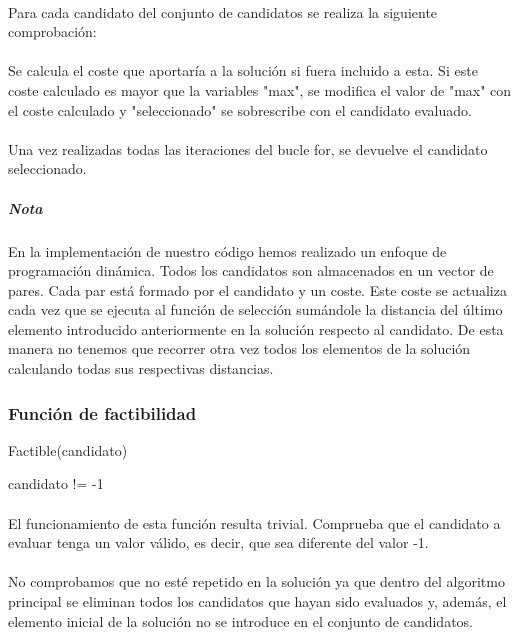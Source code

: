 \documentclass{article}
\begin{document}
	\paragraph{}Para cada candidato del conjunto de candidatos se realiza la siguiente comprobación:
	
	\paragraph{}Se calcula el coste que aportaría a la solución si fuera incluido a esta. Si este coste calculado es mayor que la variables "max", se modifica el valor de "max" con el coste calculado y "seleccionado" se sobrescribe con el candidato evaluado.
	
	\paragraph{}Una vez realizadas todas las iteraciones del bucle for, se devuelve el candidato seleccionado.
	
	\subparagraph{Nota}En la implementación de nuestro código hemos realizado un enfoque de programación dinámica. Todos los candidatos son almacenados en un vector de pares. Cada par está formado por el candidato y un coste. Este coste se actualiza cada vez que se ejecuta al función de selección sumándole la distancia del último elemento introducido anteriormente en la solución respecto al candidato. De esta manera no tenemos que recorrer otra vez todos los elementos de la solución calculando todas sus respectivas distancias.

	\subsubsection{Función de factibilidad}
	\begin{algorithm}[H]
		\caption{Factible(candidato)}
		\begin{algorithmic}
			\RETURN candidato != -1
		\end{algorithmic}
	\end{algorithm}

	\paragraph{}El funcionamiento de esta función resulta trivial. Comprueba que el candidato a evaluar tenga un valor válido, es decir, que sea diferente del valor -1. 
	
	\paragraph{}No comprobamos que no esté repetido en la solución ya que dentro del algoritmo principal se eliminan todos los candidatos que hayan sido evaluados y, además, el elemento inicial de la solución no se introduce en el conjunto de candidatos. 
	
\end{document}
